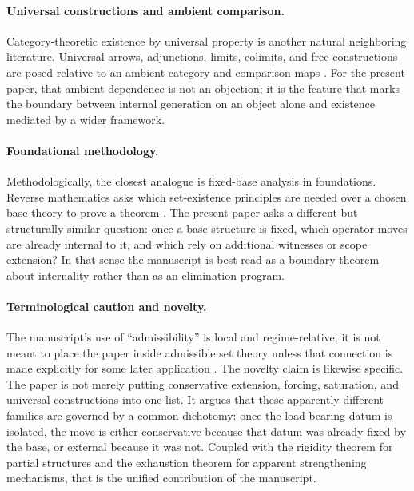 \paragraph*{Universal constructions and ambient comparison.}
Category-theoretic existence by universal property is another natural neighboring literature. Universal arrows, adjunctions, limits, colimits, and free constructions are posed relative to an ambient category and comparison maps \citep{MacLane1998}. For the present paper, that ambient dependence is not an objection; it is the feature that marks the boundary between internal generation on an object alone and existence mediated by a wider framework.

\paragraph*{Foundational methodology.}
Methodologically, the closest analogue is fixed-base analysis in foundations. Reverse mathematics asks which set-existence principles are needed over a chosen base theory to prove a theorem \citep{Simpson2009}. The present paper asks a different but structurally similar question: once a base structure is fixed, which operator moves are already internal to it, and which rely on additional witnesses or scope extension? In that sense the manuscript is best read as a boundary theorem about internality rather than as an elimination program.

\paragraph*{Terminological caution and novelty.}
The manuscript's use of ``admissibility'' is local and regime-relative; it is not meant to place the paper inside admissible set theory unless that connection is made explicitly for some later application \citep{Barwise1975}. The novelty claim is likewise specific. The paper is not merely putting conservative extension, forcing, saturation, and universal constructions into one list. It argues that these apparently different families are governed by a common dichotomy: once the load-bearing datum is isolated, the move is either conservative because that datum was already fixed by the base, or external because it was not. Coupled with the rigidity theorem for partial structures and the exhaustion theorem for apparent strengthening mechanisms, that is the unified contribution of the manuscript.
